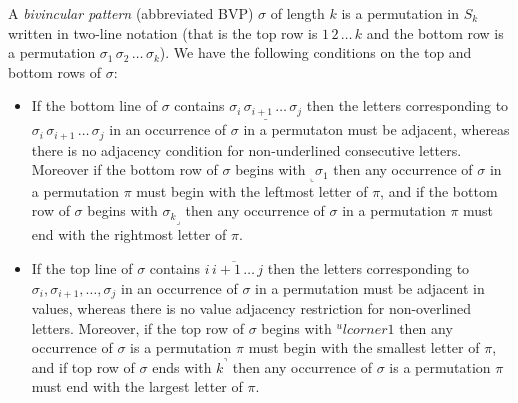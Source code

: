 \documentclass[a4paper]{llncs}
\newcommand{\ptext}{\pi}
\newcommand{\pmotif}{\sigma}
\newcommand{\x}{X}
\newcommand{\y}{Y}
\newcommand{\bmotif}{(\sigma,\x,\y)}
\begin{document}
			
A \emph{bivincular pattern} (abbreviated BVP) $\sigma$
of length $k$ is a permutation in $S_k$ written in
two-line notation 
(that is the top row is $1\,2\,\ldots\,k$ and the bottom row
is a permutation $\sigma_1\,\sigma_2\,\ldots\,\sigma_k$).
We have the following conditions on the top and bottom rows
of $\sigma$:
\begin{itemize}
	\item
	If the bottom line of $\sigma$ contains
	$\underline{\sigma_i\,\sigma_{i+1}\,\ldots\,\sigma_j}$
	then the letters corresponding to 
	$\sigma_i\,\sigma_{i+1}\,\ldots\,\sigma_j$ in an occurrence of
	$\sigma$ in a permutaton must be adjacent, whereas there is
	no adjacency condition for
	non-underlined consecutive letters.
	Moreover if the bottom row of $\sigma$ begins with
	$_\llcorner{\sigma_1}$ then any occurrence of $\sigma$ 
	in a permutation $\pi$ must begin with the leftmost 
	letter of $\pi$,
	and 
	if the bottom row of $\sigma$ begins with
	${\sigma_k}_\lrcorner$ then any occurrence of $\sigma$ 
	in a permutation $\pi$ must end with the rightmost 
	letter of $\pi$.
	\item
	If the top line of $\sigma$ contains
	$\overline{i\,i+1\,\ldots\,j}$ then the letters corresponding to
	$\sigma_i, \sigma_{i+1}, \ldots, \sigma_j$ in an
	occurrence of $\sigma$ in a permutation must be adjacent in values,
	whereas there is no value adjacency restriction for non-overlined 
	letters.
	Moreover, if the top row of $\sigma$ begins with
	$^ulcorner{1}$ then
	any occurrence of $\sigma$ is a permutation $\pi$ must begin with
	the smallest letter of $\pi$, and
	if top row of $\sigma$ ends with $k^\urcorner$ then
	any occurrence of $\sigma$ is a permutation $\pi$ must end with
	the largest letter of $\pi$.
\end{itemize}
\end{document}
